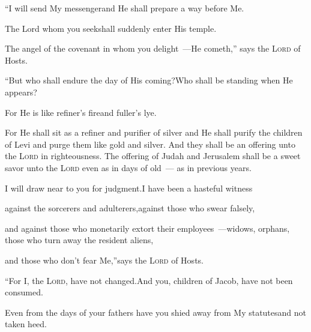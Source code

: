 
\begin{inparaenum}
  \pa {} ``I will send My messenger\pa and He shall prepare a way before Me.%
  
  \pb The Lord whom you seek\pa shall suddenly enter His temple.%
  
  \pc The angel of the covenant in whom you delight~---He cometh,'' says the \textsc{Lord} of Hosts.%
  
  \pa {} ``But who shall endure the day of His coming?\pa Who shall be standing when He appears?%
  
  \pb For He is like refiner's fire\pa and fuller's lye.%
  \smallskip%
  
  \noindent{} For He shall sit as a refiner and purifier of silver and He shall purify the children of Levi and purge them like gold and silver. And they shall be an offering unto the \textsc{Lord} in righteousness.%
   The offering of Judah and Jerusalem shall be a sweet savor unto the \textsc{Lord} even as in days of old~--- as in previous years.\smallskip%
  
  \pa {} I will draw near to you for judgment.\pa I have been a hasteful%
  witness%
  
  \pb against the sorcerers and adulterers,\pa against those who swear falsely,%
  
  \pb and against those who monetarily extort their employees~---\pa widows, orphans, those who turn away the resident aliens,%
  
  \pb and those who don't fear Me,''\pa says the \textsc{Lord} of Hosts.%
  
  \pa {} ``For I, the \textsc{Lord}, have not changed.\pa And you, children of Jacob, have not been consumed.%
  
  \pa {} Even from the days of your fathers have you shied away from My statutes\pa and not taken heed.%
  

\end{inparaenum}
